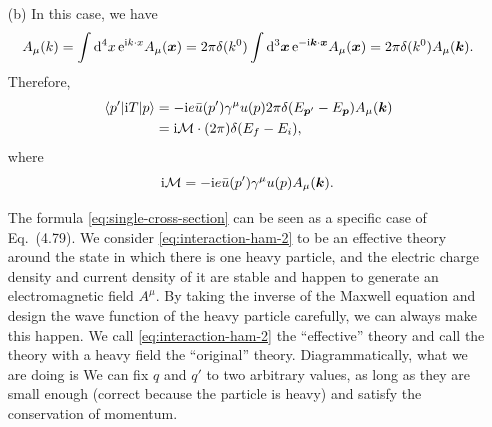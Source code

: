 \documentclass[hyperref, a4paper]{article}
\newcommand*{\ii}{\mathrm{i}}
\newcommand*{\ee}{\mathrm{e}}
\begin{document}
\begin{itemize}
\item[(b)] In this case, we have 
\begin{equation}
    A_\mu(k) = \int \dd[4]{x} \ee^{\ii k \cdot x} A_\mu(\vb*{x}) = 2 \pi \delta(k^0) \int \dd[3]{\vb*{x}} \ee^{- \ii \vb*{k} \cdot \vb*{x}} A_\mu(\vb*{x}) = 2 \pi \delta(k^0) A_\mu(\vb*{k}). 
\end{equation}  
Therefore, 
\begin{equation}
    \begin{aligned}
        \mel{p'}{\ii T}{p} &= - \ii e \bar{u}(p') \gamma^\mu u(p) 2 \pi \delta(E_{\vb*{p}'} - E_{\vb*{p}}) A_\mu(\vb*{k}) \\
        &= \ii \mathcal{M} \cdot (2\pi) \delta(E_f - E_i) ,
    \end{aligned}
\end{equation}
where
\begin{equation}
    \ii \mathcal{M} = - \ii e \bar{u}(p') \gamma^\mu u(p) A_\mu(\vb*{k}).
\end{equation}

The formula \eqref{eq:single-cross-section} can be seen as a specific case of Eq.~(4.79). 
We consider \eqref{eq:interaction-ham-2} to be an effective theory around the state in which there is one heavy
particle, and the electric charge density and current density of it are stable and happen to generate an 
electromagnetic field $A^\mu$. By taking the inverse of the Maxwell equation and design the wave function of 
the heavy particle carefully, we can always make this happen. We call \eqref{eq:interaction-ham-2} the
``effective'' theory and call the theory with a heavy field the ``original'' theory. 
Diagrammatically, what we are doing is 
We can fix $q$ and $q'$ to two arbitrary values, as long as they are small enough (correct because the particle 
is heavy) and satisfy the conservation of momentum.


\end{itemize}
\end{document}
